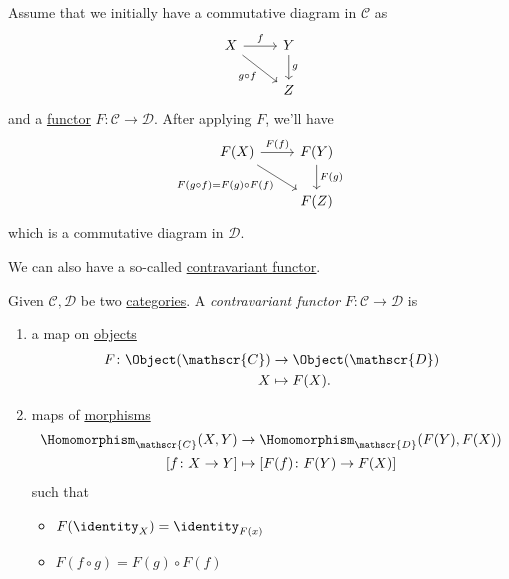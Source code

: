 \begin{eg}
	Assume that we initially have a commutative diagram in \(\mathscr{C} \) as
	\[
		\begin{tikzcd}
			X \ar[rd, "g\circ f"']\ar[r, "f"] & Y\ar[d, "g"]\\
			& Z
		\end{tikzcd}
	\]
	and a \hyperref[def:functor]{functor} \(F\colon \mathscr{C} \to \mathscr{D}\).  After applying \(F\), we'll have
	\[
		\begin{tikzcd}
			F(X) \ar[rd, "F(g\circ f)=F(g)\circ F(f)"']\ar[r, "F(f)"] & F(Y)\ar[d, "F(g)"]\\
			& F(Z)
		\end{tikzcd}
	\]
	which is a commutative diagram in \(\mathscr{D}\).
\end{eg}

We can also have a so-called \underline{contravariant \hyperref[def:functor]{functor}}.
\begin{definition}\label{def:contravariant-functor}
	Given \(\mathscr{C} , \mathscr{D} \) be two \hyperref[def:category]{categories}. A \emph{contravariant functor}
	\(F\colon \mathscr{C} \to \mathscr{D}\) is
	\begin{enumerate}[(1)]
		\item a map on \hyperref[def:object]{objects}
		      \[
			      \begin{split}
				      F\colon \Object(\mathscr{C} )&\to \Object(\mathscr{D} )\\
				      X&\mapsto F(X).
			      \end{split}
		      \]
		\item maps of \hyperref[def:morphism]{morphisms}
		      \[
			      \begin{split}
				      \Homomorphism_{\mathscr{C} }(X, Y)&\to \Homomorphism_{\mathscr{D} }(F(Y), F(X))\\
				      \left[f\colon X\to Y\right] &\mapsto \left[F(f)\colon F(Y)\to F(X)\right]
			      \end{split}
		      \]
		      such that
		      \begin{itemize}
			      \item \(F(\identity_{X} ) = \identity_{F(x)} \)
			      \item \(F(f\circ g) = F(g)\circ F(f)\)
		      \end{itemize}
	\end{enumerate}
\end{definition}


